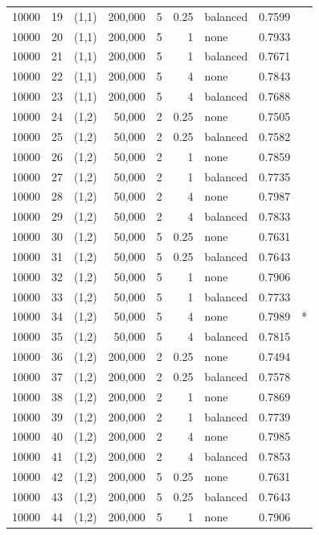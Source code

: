 \documentclass[10pt,a4paper]{article}
\begin{document}
{\begin{longtable}{@{}llrrrrlrl@{}}
10000 & 19 & (1,1) & 200,000 & 5 & 0.25 & balanced & 0.7599 &  \\
10000 & 20 & (1,1) & 200,000 & 5 & 1 & none & 0.7933 &  \\
10000 & 21 & (1,1) & 200,000 & 5 & 1 & balanced & 0.7671 &  \\
10000 & 22 & (1,1) & 200,000 & 5 & 4 & none & 0.7843 &  \\
10000 & 23 & (1,1) & 200,000 & 5 & 4 & balanced & 0.7688 &  \\
10000 & 24 & (1,2) & 50,000 & 2 & 0.25 & none & 0.7505 &  \\
10000 & 25 & (1,2) & 50,000 & 2 & 0.25 & balanced & 0.7582 &  \\
10000 & 26 & (1,2) & 50,000 & 2 & 1 & none & 0.7859 &  \\
10000 & 27 & (1,2) & 50,000 & 2 & 1 & balanced & 0.7735 &  \\
10000 & 28 & (1,2) & 50,000 & 2 & 4 & none & 0.7987 &  \\
10000 & 29 & (1,2) & 50,000 & 2 & 4 & balanced & 0.7833 &  \\
10000 & 30 & (1,2) & 50,000 & 5 & 0.25 & none & 0.7631 &  \\
10000 & 31 & (1,2) & 50,000 & 5 & 0.25 & balanced & 0.7643 &  \\
10000 & 32 & (1,2) & 50,000 & 5 & 1 & none & 0.7906 &  \\
10000 & 33 & (1,2) & 50,000 & 5 & 1 & balanced & 0.7733 &  \\
10000 & 34 & (1,2) & 50,000 & 5 & 4 & none & 0.7989 & * \\
10000 & 35 & (1,2) & 50,000 & 5 & 4 & balanced & 0.7815 &  \\
10000 & 36 & (1,2) & 200,000 & 2 & 0.25 & none & 0.7494 &  \\
10000 & 37 & (1,2) & 200,000 & 2 & 0.25 & balanced & 0.7578 &  \\
10000 & 38 & (1,2) & 200,000 & 2 & 1 & none & 0.7869 &  \\
10000 & 39 & (1,2) & 200,000 & 2 & 1 & balanced & 0.7739 &  \\
10000 & 40 & (1,2) & 200,000 & 2 & 4 & none & 0.7985 &  \\
10000 & 41 & (1,2) & 200,000 & 2 & 4 & balanced & 0.7853 &  \\
10000 & 42 & (1,2) & 200,000 & 5 & 0.25 & none & 0.7631 &  \\
10000 & 43 & (1,2) & 200,000 & 5 & 0.25 & balanced & 0.7643 &  \\
10000 & 44 & (1,2) & 200,000 & 5 & 1 & none & 0.7906 &  \\

\end{longtable}}
\end{document}
